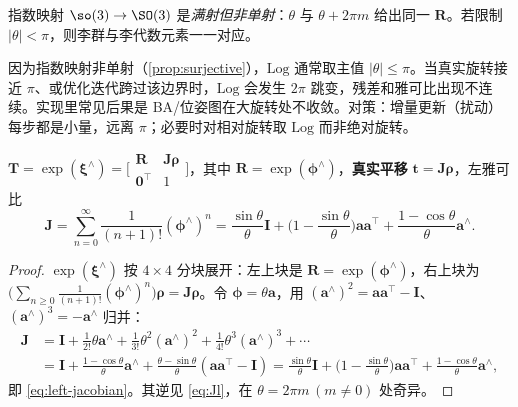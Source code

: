 \begin{proposition}[满射非单射]\label{prop:surjective}
指数映射 $\so(3)\to\SO(3)$ 是\emph{满射但非单射}：$\theta$ 与 $\theta+2\pi m$ 给出同一 $\mathbf{R}$。若限制 $|\theta|<\pi$，则李群与李代数元素一一对应。
\end{proposition}

\begin{pitfall}
因为指数映射非单射（\cref{prop:surjective}），$\mathrm{Log}$ 通常取主值 $|\theta|\le\pi$。当真实旋转接近 $\pi$、或优化迭代跨过该边界时，$\mathrm{Log}$ 会发生 $2\pi$ 跳变，残差和雅可比出现不连续。实现里常见后果是 BA/位姿图在大旋转处不收敛。对策：增量更新（扰动）每步都是小量，远离 $\pi$；必要时对相对旋转取 $\mathrm{Log}$ 而非绝对旋转。
\end{pitfall}

\begin{theorem}[$\SE(3)$ 指数映射]\label{thm:se3-exp}
$\mathbf{T}=\exp(\boldsymbol{\xi}^\wedge)=\big[\begin{smallmatrix}\mathbf{R}&\mathbf{J}\boldsymbol{\rho}\\\mathbf{0}^\top&1\end{smallmatrix}\big]$，其中 $\mathbf{R}=\exp(\boldsymbol{\phi}^\wedge)$，\textbf{真实平移} $\mathbf{t}=\mathbf{J}\boldsymbol{\rho}$，左雅可比
\begin{equation}
  \mathbf{J}=\sum_{n=0}^{\infty}\frac{1}{(n+1)!}(\boldsymbol{\phi}^\wedge)^n
  =\frac{\sin\theta}{\theta}\mathbf{I}+\Big(1-\frac{\sin\theta}{\theta}\Big)\mathbf{a}\mathbf{a}^\top+\frac{1-\cos\theta}{\theta}\mathbf{a}^\wedge.
  \label{eq:left-jacobian}
\end{equation}
\end{theorem}
\begin{proof}
$\exp(\boldsymbol{\xi}^\wedge)$ 按 $4\times4$ 分块展开：左上块是 $\mathbf{R}=\exp(\boldsymbol{\phi}^\wedge)$，右上块为 $\big(\sum_{n\ge0}\tfrac{1}{(n+1)!}(\boldsymbol{\phi}^\wedge)^n\big)\boldsymbol{\rho}=\mathbf{J}\boldsymbol{\rho}$。令 $\boldsymbol{\phi}=\theta\mathbf{a}$，用 $(\mathbf{a}^\wedge)^2=\mathbf{a}\mathbf{a}^\top-\mathbf{I}$、$(\mathbf{a}^\wedge)^3=-\mathbf{a}^\wedge$ 归并：
\begin{align*}
  \mathbf{J}&=\mathbf{I}+\tfrac{1}{2!}\theta\mathbf{a}^\wedge+\tfrac{1}{3!}\theta^2(\mathbf{a}^\wedge)^2+\tfrac{1}{4!}\theta^3(\mathbf{a}^\wedge)^3+\cdots\\
  &=\mathbf{I}+\frac{1-\cos\theta}{\theta}\mathbf{a}^\wedge+\frac{\theta-\sin\theta}{\theta}(\mathbf{a}\mathbf{a}^\top-\mathbf{I})
   =\frac{\sin\theta}{\theta}\mathbf{I}+\Big(1-\frac{\sin\theta}{\theta}\Big)\mathbf{a}\mathbf{a}^\top+\frac{1-\cos\theta}{\theta}\mathbf{a}^\wedge,
\end{align*}
即 \cref{eq:left-jacobian}。其逆见 \cref{eq:Jl}，在 $\theta=2\pi m\,(m\neq0)$ 处奇异。
\end{proof}

